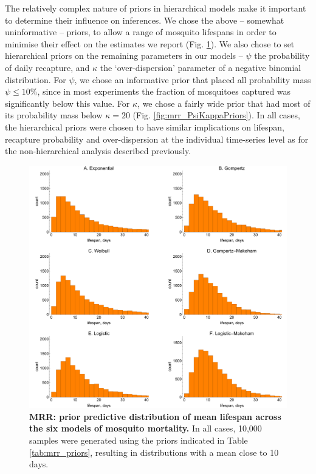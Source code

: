 \documentclass[12pt]{article}
\begin{document}
The relatively complex nature of priors in hierarchical models make it important to determine their influence on inferences. We chose the above -- somewhat uninformative -- priors, to allow a range of mosquito lifespans in order to minimise their effect on the estimates we report (Fig. \ref{fig:mrr_meanLifespanPrior}). We also chose to set hierarchical priors on the remaining parameters in our models -- $\psi$ the probability of daily recapture, and $\kappa$ the `over-dispersion' parameter of a negative binomial distribution. For $\psi$, we chose an informative prior that placed all probability mass $\psi\leq 10\%$, since in most experiments the fraction of mosquitoes captured was significantly below this value. For $\kappa$, we chose a fairly wide prior that had most of its probability mass below $\kappa=20$ (Fig. \ref{fig:mrr_PsiKappaPriors}). In all cases, the hierarchical priors were chosen to have similar implications on lifespan, recapture probability and over-dispersion at the individual time-series level as for the non-hierarchical analysis described previously.

\begin{figure}[h]
	\centerline{\includegraphics[width=1\textwidth]{./Figure_files/mrr_lifespan_priors.pdf}}
	\caption{\textbf{MRR: prior predictive distribution of mean lifespan across the six models of mosquito mortality.} In all cases, 10,000 samples were generated using the priors indicated in Table \ref{tab:mrr_priors}, resulting in distributions with a mean close to 10 days.}
	\label{fig:mrr_meanLifespanPrior}
\end{figure}
\end{document}
